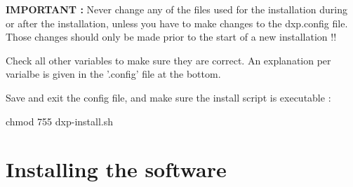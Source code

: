 \begin{myindent}
\noindent \textbf{IMPORTANT : }Never change any of the files used for the installation during or after the installation, unless you have to make changes to the dxp.config file. Those changes should only be made prior to the start
of a new installation !!
\newline

\noindent Check all other variables to make sure they are correct. An explanation per varialbe is given in the '.config' file at the bottom.

\noindent Save and exit the config file, and make sure the install script is executable :
\newline

\begin{urlboxstyle}
chmod 755 dxp-install.sh
\end{urlboxstyle}
\newline
\end{myindent}

{\let\clearpage\relax\par \chapter{Installing the software}}

